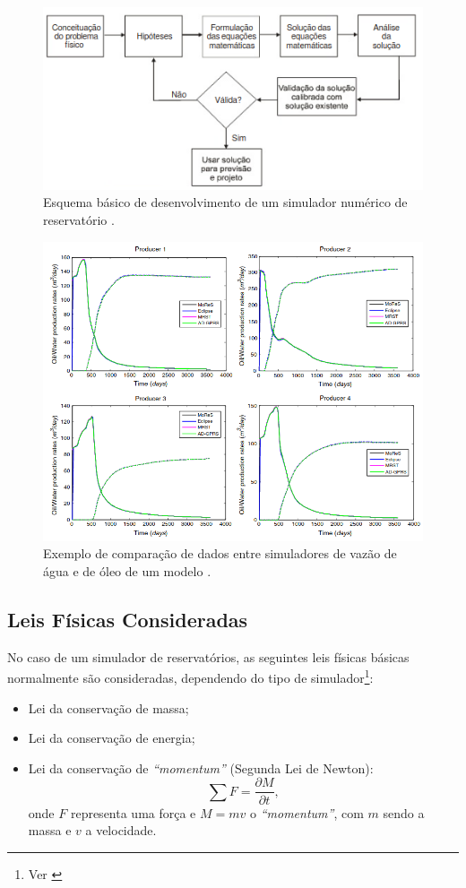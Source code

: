 \begin{figure}[H]
\centering
\includegraphics[width=.75\textwidth]{figs/revisao/revisao_simuesq.png}
\caption{Esquema b\'{a}sico de desenvolvimento de um simulador num\'{e}rico de reservat\'{o}rio \cite[p. 519]{engres}.}\label{fig:rev_simuesq}
\end{figure}

\begin{figure}[H]
\centering
\includegraphics[width=.75\textwidth]{figs/revisao/revisao_simuex.png}
\caption{Exemplo de compara\c{c}\~{a}o de dados entre simuladores de vaz\~{a}o de \'{a}gua e de \'{o}leo de um modelo \cite{eggM}.}\label{fig:rev_simuex}
\end{figure}

\subsection{Leis F\'{i}sicas Consideradas}

No caso de um simulador de reservat\'{o}rios, as seguintes leis f\'{i}sicas b\'{a}sicas normalmente s\~{a}o consideradas, dependendo do tipo de simulador\footnote{Ver \cite[p. 520]{engres}}:

\begin{itemize}
\item Lei da conserva\c{c}\~{a}o de massa;
\item Lei da conserva\c{c}\~{a}o de energia;
\item Lei da conserva\c{c}\~{a}o de \textit{``momentum''} (Segunda Lei de Newton):
\begin{equation}
\sum F = \frac{\partial M}{\partial t},
\end{equation}
onde $F$ representa uma for\c{c}a e $M = mv$ o \textit{``momentum''}, com $m$ sendo a massa e $v$ a velocidade.
\end{itemize}

